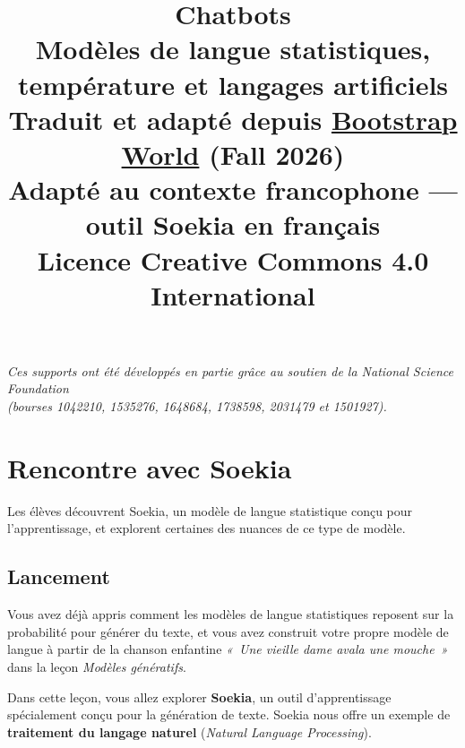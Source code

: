 \documentclass[12pt,a4paper]{article}
\title{%
  \vspace{-2cm}
  {\Huge\bfseries Chatbots}\\[0.5em]
  {\large Modèles de langue statistiques, température et langages artificiels}\\[1em]
  {\normalsize Traduit et adapté depuis \href{https://www.bootstrapworld.org/materials/fall2026/en-us/lessons/stat-lang-models-chatbots/}{Bootstrap World} (Fall 2026)}\\
  {\normalsize Adapté au contexte francophone — outil Soekia en français}\\[0.5em]
  {\normalsize Licence Creative Commons 4.0 International}
}
\date{}
\author{}
\begin{document}
\maketitle
\thispagestyle{empty}

\vspace{2cm}
\begin{center}
  \textit{Ces supports ont été développés en partie grâce au soutien de la National Science Foundation\\
  (bourses 1042210, 1535276, 1648684, 1738598, 2031479 et 1501927).}
\end{center}

\newpage
\tableofcontents
\newpage

\section{Rencontre avec Soekia}

\begin{overviewbox}
  Les élèves découvrent Soekia, un modèle de langue statistique conçu pour l'apprentissage, et explorent certaines des nuances de ce type de modèle.
\end{overviewbox}

\subsection{Lancement}

Vous avez déjà appris comment les modèles de langue statistiques reposent sur la probabilité pour générer du texte, et vous avez construit votre propre modèle de langue à partir de la chanson enfantine \emph{«~Une vieille dame avala une mouche~»} dans la leçon \emph{Modèles génératifs}.

Dans cette leçon, vous allez explorer \textbf{Soekia}, un outil d'apprentissage spécialement conçu pour la génération de texte. Soekia nous offre un exemple de \textbf{traitement du langage naturel} (\emph{Natural Language Processing}).
\end{document}
